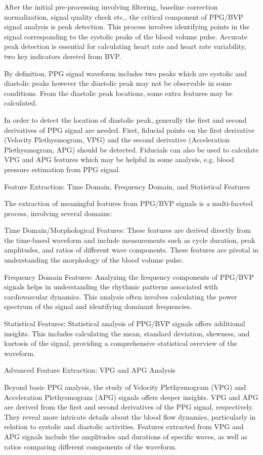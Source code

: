 After the initial pre-processing involving filtering, baseline correction normalization, signal quality check etc.,
the critical component of PPG/BVP signal analysis is peak detection. This process involves identifying points in the signal corresponding to the systolic peaks of the blood volume pulse. Accurate peak detection is essential for calculating heart rate and heart rate variability, two key indicators dereivd from BVP.

By definition, PPG signal waveform includes two peaks which are systolic and diastolic peaks however the diastolic peak may not be observable in some conditions. From the diastolic peak locations, some extra features may be calculated.

In order to detect the location of diastolic peak, generally the first and second derivatives of PPG signal are needed. First, fiducial points on the first derivative (Velocity Plethysmogram, VPG) and the second derivative (Acceleration Plethysmogram, APG) should be detected. Fiducials can also be used to calculate VPG and APG features which may be helpful in some analysis, e.g. blood pressure estimation from PPG signal.

Feature Extraction: Time Domain, Frequency Domain, and Statistical Features

The extraction of meaningful features from PPG/BVP signals is a multi-faceted process, involving several domains:

Time Domain/Morphological Features: These features are derived directly from the time-based waveform and include measurements such as cycle duration, peak amplitudes, and ratios of different wave components. These features are pivotal in understanding the morphology of the blood volume pulse.

Frequency Domain Features: Analyzing the frequency components of PPG/BVP signals helps in understanding the rhythmic patterns associated with cardiovascular dynamics. This analysis often involves calculating the power spectrum of the signal and identifying dominant frequencies.

Statistical Features: Statistical analysis of PPG/BVP signals offers additional insights. This includes calculating the mean, standard deviation, skewness, and kurtosis of the signal, providing a comprehensive statistical overview of the waveform.

Advanced Feature Extraction: VPG and APG Analysis

Beyond basic PPG analysis, the study of Velocity Plethysmogram (VPG) and Acceleration Plethysmogram (APG) signals offers deeper insights. VPG and APG are derived from the first and second derivatives of the PPG signal, respectively. They reveal more intricate details about the blood flow dynamics, particularly in relation to systolic and diastolic activities. Features extracted from VPG and APG signals include the amplitudes and durations of specific waves, as well as ratios comparing different components of the waveform.

